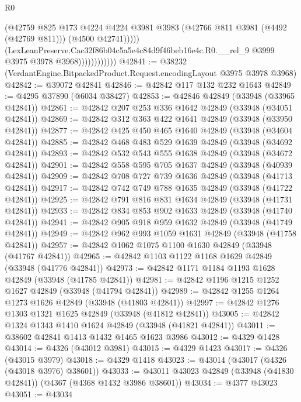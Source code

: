 \begin{lexlean}{R0}
\begin{coremodule}
                                (@42759
                                  @825
                                  @173
                                  @4224
                                  @4224
                                  @3981
                                  @3983
                                  (@42766 @811 @3981 (@4492 (@42769 @811)))
                                  (@4500 @42741)))))
                          (LexLeanPreserve.Cac32f86b04c5a5e4c84d9f46beb16e4c.R0.__rel_9
                            @3999
                            @3975
                            @3978
                            @3968))))))))))))
@42841 := @38232 (VerdantEngine.BitpackedProduct.Request.encodingLayout @3975 @3978 @3968)
@42842 := @39072 @42841
@42846 := @42842 @117 @132 @232 @1643
@42849 := @4295 @37890 (@6034 @38427)
@42853 := @42846 @42849 (@33948 (@33965 @42841))
@42861 := @42842 @207 @253 @336 @1642 @42849 (@33948 (@34051 @42841))
@42869 := @42842 @312 @363 @422 @1641 @42849 (@33948 (@33950 @42841))
@42877 := @42842 @425 @450 @465 @1640 @42849 (@33948 (@34604 @42841))
@42885 := @42842 @468 @483 @529 @1639 @42849 (@33948 (@34692 @42841))
@42893 := @42842 @532 @543 @555 @1638 @42849 (@33948 (@34672 @42841))
@42901 := @42842 @558 @595 @705 @1637 @42849 (@33948 (@40939 @42841))
@42909 := @42842 @708 @727 @739 @1636 @42849 (@33948 (@41713 @42841))
@42917 := @42842 @742 @749 @788 @1635 @42849 (@33948 (@41722 @42841))
@42925 := @42842 @791 @816 @831 @1634 @42849 (@33948 (@41731 @42841))
@42933 := @42842 @834 @853 @902 @1633 @42849 (@33948 (@41740 @42841))
@42941 := @42842 @905 @918 @959 @1632 @42849 (@33948 (@41749 @42841))
@42949 := @42842 @962 @993 @1059 @1631 @42849 (@33948 (@41758 @42841))
@42957 := @42842 @1062 @1075 @1100 @1630 @42849 (@33948 (@41767 @42841))
@42965 := @42842 @1103 @1122 @1168 @1629 @42849 (@33948 (@41776 @42841))
@42973 := @42842 @1171 @1184 @1193 @1628 @42849 (@33948 (@41785 @42841))
@42981 := @42842 @1196 @1215 @1252 @1627 @42849 (@33948 (@41794 @42841))
@42989 := @42842 @1255 @1264 @1273 @1626 @42849 (@33948 (@41803 @42841))
@42997 := @42842 @1276 @1303 @1321 @1625 @42849 (@33948 (@41812 @42841))
@43005 := @42842 @1324 @1343 @1410 @1624 @42849 (@33948 (@41821 @42841))
@43011 := @38602 @42841 @1413 @1432 @1465 @1623 @3986
@43012 := @4329 @1428
@43014 := @4326 (@43012 @3981)
@43015 := @4329 @1423
@43017 := @4326 (@43015 @3979)
@43018 := @4329 @1418
@43023 := @43014 (@43017 (@4326 (@43018 @3976) @38601))
@43033 := @43011 @43023 @42849 (@33948 (@41830 @42841)) (@4367 (@4368 @1432 @3986 @38601))
@43034 := @4377 @43023
@43051 := @43034

\end{coremodule}
\end{lexlean}
